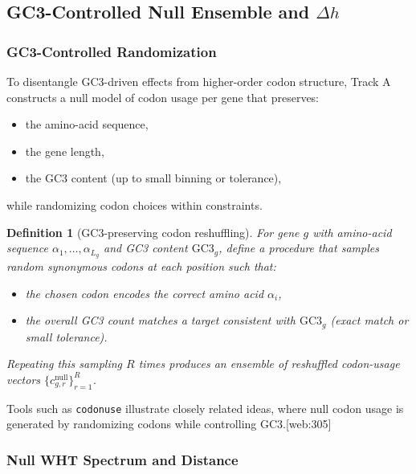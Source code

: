 \documentclass[11pt]{article}
\newtheorem{definition}{Definition}[section]
\begin{document}
\subsection{GC3-Controlled Null Ensemble and \texorpdfstring{$\Delta h$}{Δh}}

\subsubsection{GC3-Controlled Randomization}

To disentangle GC3-driven effects from higher-order codon structure, Track A constructs a null model of codon usage per gene that preserves:
\begin{itemize}[leftmargin=1.8em]
  \item the amino-acid sequence,
  \item the gene length,
  \item the GC3 content (up to small binning or tolerance),
\end{itemize}
while randomizing codon choices within constraints.

\begin{definition}[GC3-preserving codon reshuffling]
For gene \(g\) with amino-acid sequence \(\alpha_1,\dots,\alpha_{L_g}\) and GC3 content \(\mathrm{GC3}_g\), define a procedure that samples random synonymous codons at each position such that:
\begin{itemize}
  \item the chosen codon encodes the correct amino acid \(\alpha_i\),
  \item the overall GC3 count matches a target consistent with \(\mathrm{GC3}_g\) (exact match or small tolerance).
\end{itemize}
Repeating this sampling \(R\) times produces an ensemble of reshuffled codon-usage vectors \(\{c_{g,r}^{\mathrm{null}}\}_{r=1}^R\).
\end{definition}

Tools such as \texttt{codonuse} illustrate closely related ideas, where null codon usage is generated by randomizing codons while controlling GC3.[web:305]

\subsubsection{Null WHT Spectrum and Distance}
\end{document}
